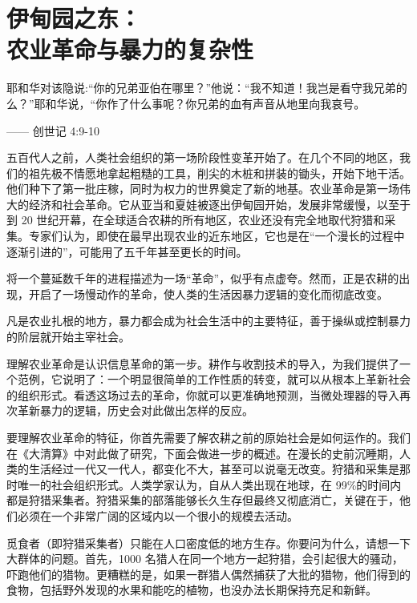 \chapter[伊甸园之东]{伊甸园之东：\\ 农业革命与暴力的复杂性}

\begin{tcolorbox}
耶和华对该隐说:“你的兄弟亚伯在哪里？”他说：“我不知道！我岂是看守我兄弟的么？”耶和华说，“你作了什么事呢？你兄弟的血有声音从地里向我哀号。
\begin{flushright}
—— 创世记 4:9-10 
\end{flushright}
\end{tcolorbox}

五百代人之前，人类社会组织的第一场阶段性变革开始了。在几个不同的地区，我们的祖先极不情愿地拿起粗糙的工具，削尖的木桩和拼装的锄头，开始下地干活。他们种下了第一批庄稼，同时为权力的世界奠定了新的地基。农业革命是第一场伟大的经济和社会革命。它从亚当和夏娃被逐出伊甸园开始，发展非常缓慢，以至于到 20 世纪开幕，在全球适合农耕的所有地区，农业还没有完全地取代狩猎和采集。专家们认为，即使在最早出现农业的近东地区，它也是在“一个漫长的过程中逐渐引进的”，可能用了五千年甚至更长的时间。

将一个蔓延数千年的进程描述为一场“革命”，似乎有点虚夸。然而，正是农耕的出现，开启了一场慢动作的革命，使人类的生活因暴力逻辑的变化而彻底改变。

凡是农业扎根的地方，暴力都会成为社会生活中的主要特征，善于操纵或控制暴力的阶层就开始主宰社会。

理解农业革命是认识信息革命的第一步。耕作与收割技术的导入，为我们提供了一个范例，它说明了：一个明显很简单的工作性质的转变，就可以从根本上革新社会的组织形式。看透这场过去的革命，你就可以更准确地预测，当微处理器的导入再次革新暴力的逻辑，历史会对此做出怎样的反应。

要理解农业革命的特征，你首先需要了解农耕之前的原始社会是如何运作的。我们在《大清算》中对此做了研究，下面会做进一步的概述。在漫长的史前沉睡期，人类的生活经过一代又一代人，都变化不大，甚至可以说毫无改变。狩猎和采集是那时唯一的社会组织形式。人类学家认为，自从人类出现在地球，在 99\%的时间内都是狩猎采集者。狩猎采集的部落能够长久生存但最终又彻底消亡，关键在于，他们必须在一个非常广阔的区域内以一个很小的规模去活动。

觅食者（即狩猎采集者）只能在人口密度低的地方生存。你要问为什么，请想一下大群体的问题。首先，1000 名猎人在同一个地方一起狩猎，会引起很大的骚动，吓跑他们的猎物。更糟糕的是，如果一群猎人偶然捕获了大批的猎物，他们得到的食物，包括野外发现的水果和能吃的植物，也没办法长期保持充足和新鲜。

